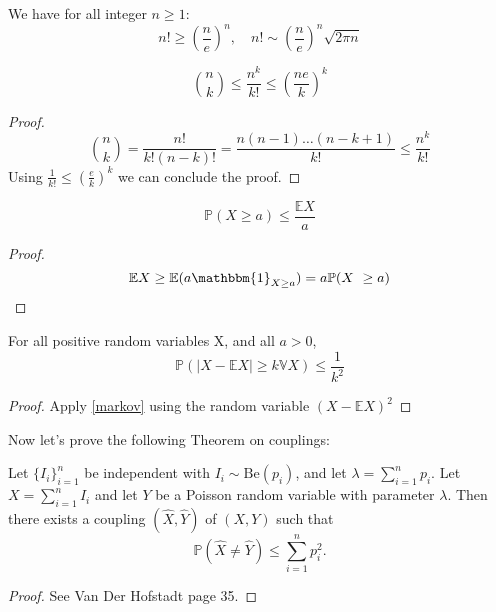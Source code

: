 \begin{theorem}\label{stirling} 
	We have for all integer $n\geq 1$:
	\begin{equation}
		n! \geq (\frac{n}{e})^n ,\quad	n! \sim (\frac{n}{e})^n \sqrt{2\pi n}
	\end{equation}
\end{theorem}

\begin{corollary}\label{th:NChooseK}
	\begin{equation}
		\binom{n}{k} \leq \frac{n^k}{k!} \leq (\frac{ne}{k})^k
	\end{equation}
\end{corollary}
\begin{proof}
	\begin{equation}
		\binom{n}{k} 	= \frac{n!}{k!(n-k)!} = \frac{n(n-1)\ldots(n-k+1)}{k!} \leq \frac{n^k}{k!}  
	\end{equation}
	Using $\frac{1}{k!} \leq (\frac{e}{k})^k$ we can conclude the proof.
\end{proof}
	\begin{theorem}\label{markov}
	\begin{equation}
		\mathbb{P}(X \geq a) \leq \frac{\mathbb{E}X}{a}
	\end{equation}
\end{theorem}
\begin{proof}
    \begin{equation}
	    \mathbb{E}X \geq \mathbb{E}(a\mathbbm{1}_{X\geq a} ) = a \mathbb{P}(X \geq a)
    \end{equation}
\end{proof}
\begin{corollary}\label{cheby} 
	For all positive random variables X, and all $a>0$,
	\begin{equation}
		\mathbb{P}(|X - \mathbb{E}X| \geq k \mathbb{V}X ) \leq \frac{1}{k^2}
	\end{equation}
\end{corollary}
\begin{proof}
    Apply \eqref{markov} using the random variable $(X-\mathbb{E}X)^2$
\end{proof}
Now let's prove the following Theorem on couplings:
\begin{theorem}
	Let $\{I_i\}_{i=1}^n$ be independent with $I_i \sim \text{Be}(p_i)$, and let $\lambda = \sum_{i=1}^n p_i$.
Let $X = \sum_{i=1}^n I_i$ and let $Y$ be a Poisson random variable with parameter $\lambda$.
Then there exists a coupling $(\hat{X}, \hat{Y})$ of $(X, Y)$ such that
\begin{equation}
	\mathbb{P}(\hat{X} \neq \hat{Y}) \leq \sum_{i=1}^n p_i^2.
\end{equation}
\end{theorem}
\begin{proof}
	See Van Der Hofstadt page 35.
\end{proof}

